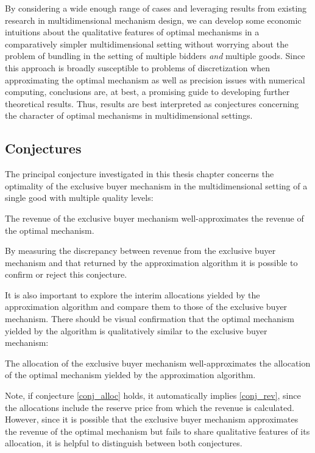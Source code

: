 \noindent By considering a wide enough range of cases and leveraging results from existing research in multidimensional mechanism design, we can develop some economic intuitions about the qualitative features of optimal mechanisms in a comparatively simpler multidimensional setting without worrying about the problem of bundling in the setting of multiple bidders \textit{and} multiple goods. Since this approach is broadly susceptible to problems of discretization when approximating the optimal mechanism as well as precision issues with numerical computing, conclusions are, at best, a promising guide to developing further theoretical results. Thus, results are best interpreted as conjectures concerning the character of optimal mechanisms in multidimensional settings.




\subsection{Conjectures}\label{subsec_conj}

The principal conjecture investigated in this thesis chapter concerns the optimality of the exclusive buyer mechanism in the multidimensional setting of a single good with multiple quality levels:

\begin{conjecture}[Revenue]\label{conj_rev}
The revenue of the exclusive buyer mechanism well-approximates the revenue of the optimal mechanism.
\end{conjecture}

\noindent By measuring the discrepancy between revenue from the exclusive buyer mechanism and that returned by the approximation algorithm it is possible to confirm or reject this conjecture. 

It is also important to explore the interim allocations yielded by the approximation algorithm and compare them to those of the exclusive buyer mechanism. There should be visual confirmation that the optimal mechanism yielded by the algorithm is qualitatively similar to the exclusive buyer mechanism:

\begin{conjecture}[Allocations]\label{conj_alloc}
The allocation of the exclusive buyer mechanism well-approximates the allocation of the optimal mechanism yielded by the approximation algorithm.
\end{conjecture}

\noindent Note, if conjecture \ref{conj_alloc} holds, it automatically implies \ref{conj_rev}, since the allocations include the reserve price from which the revenue is calculated. However, since it is possible that the exclusive buyer mechanism approximates the revenue of the optimal mechanism but fails to share qualitative features of its allocation, it is helpful to distinguish between both conjectures.

